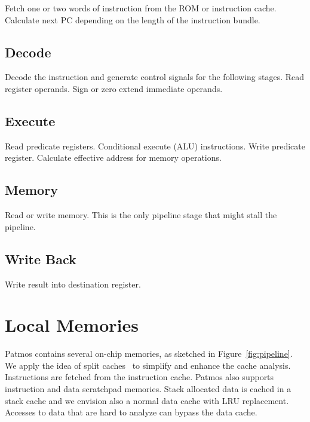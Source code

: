 \documentclass[a4paper,fontsize=10pt,twoside,DIV15,BCOR12mm,headinclude=true,footinclude=false,pagesize,bibtotoc]{scrbook}
\newcommand{\comment}[3]{

\textsf{\textbf{#1}} {\color{#3}#2}}
\newcommand{\stefan}[1]{\comment{Stefan}{#1}{RoyalPurple}}
\renewcommand{\stefan}[1]{}
\begin{document}
Fetch one or two words of instruction from the ROM or instruction cache.
Calculate next PC depending on the length of the instruction bundle.

\subsection{Decode}

Decode the instruction and generate control signals for the following stages.
Read register operands. Sign or zero extend immediate operands.

\subsection{Execute}

Read predicate registers. Conditional execute (ALU) instructions.
Write predicate register. Calculate effective address for memory operations.

\subsection{Memory}

Read or write memory. This is the only pipeline stage that might
stall the pipeline.

\subsection{Write Back}

Write result into destination register.

\stefan{Note that in the \texttt{pasim} simulator the Memory and Write Back stages are merged into a single MW stage at the time of writing,
and the stages are simulated from back to front.
While this has no effect on the timing and hazards of the instructions, there is only a single bypass from MW to EX (per pipeline). Apart
from that, all implementations of all instructions in the simulator should adhere to the above description of the stages.}

\section{Local Memories}

Patmos contains several on-chip memories, as sketched in Figure~\ref{fig:pipeline}.
We apply the idea of split caches~\cite{jop:dcache:rts} to simplify and enhance
the cache analysis. Instructions are fetched from the instruction cache.
Patmos also supports instruction and data scratchpad memories.
Stack allocated data is cached in a stack cache and we envision also a normal
data cache with LRU replacement. Accesses to data that are hard to analyze can
bypass the data cache.
\end{document}
